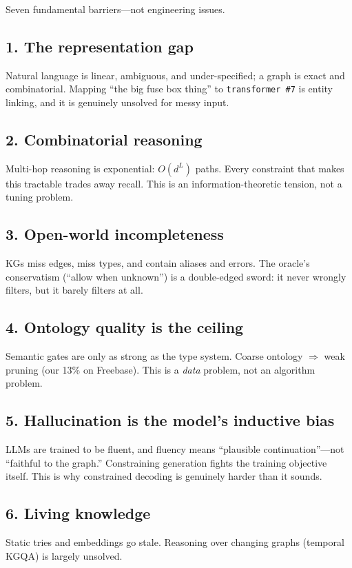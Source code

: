 \documentclass[11pt,a4paper]{article}
\begin{document}
Seven fundamental barriers---not engineering issues.

\subsection{1. The representation gap}
Natural language is linear, ambiguous, and under-specified; a graph is
exact and combinatorial.  Mapping ``the big fuse box thing'' to
\texttt{transformer \#7} is entity linking, and it is genuinely
unsolved for messy input.

\subsection{2. Combinatorial reasoning}
Multi-hop reasoning is exponential: $O(d^L)$ paths.  Every constraint
that makes this tractable trades away recall.  This is an
information-theoretic tension, not a tuning problem.

\subsection{3. Open-world incompleteness}
KGs miss edges, miss types, and contain aliases and errors.  The
oracle's conservatism (``allow when unknown'') is a double-edged
sword: it never wrongly filters, but it barely filters at all.

\subsection{4. Ontology quality is the ceiling}
Semantic gates are only as strong as the type system.  Coarse
ontology $\Rightarrow$ weak pruning (our 13\% on Freebase).  This is a
\emph{data} problem, not an algorithm problem.

\subsection{5. Hallucination is the model's inductive bias}
LLMs are trained to be fluent, and fluency means ``plausible
continuation''---not ``faithful to the graph.''  Constraining
generation fights the training objective itself.  This is why
constrained decoding is genuinely harder than it sounds.

\subsection{6. Living knowledge}
Static tries and embeddings go stale.  Reasoning over changing graphs
(temporal KGQA) is largely unsolved.
\end{document}
